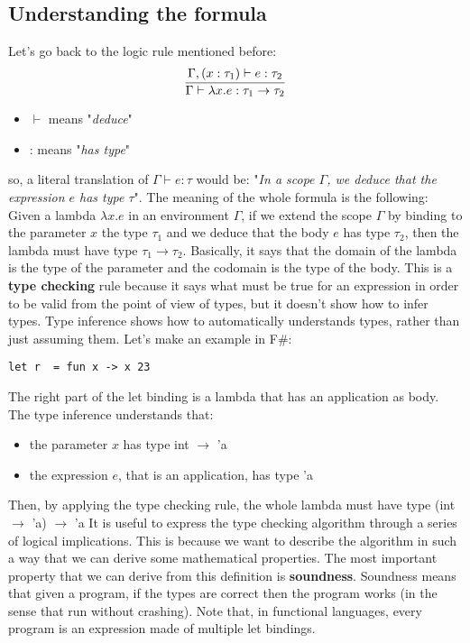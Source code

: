 \subsection{Understanding the formula}
Let's go back to the logic rule mentioned before:
\[
    \infer{\Gamma \vdash \lambda x.e : \tau_{1} \rightarrow \tau_{2}}{\Gamma, (x:\tau_{1}) \vdash e:\tau_{2}}\]
\begin{itemize}
    \item $\vdash$ means "\textit{deduce}"
    \item : means "\textit{has type}"
\end{itemize}
so, a literal translation of $\Gamma \vdash e : \tau$ would be: "\textit{In a scope $\Gamma$, we deduce that the expression $e$ has type $\tau$}".\newline\newline
The meaning of the whole formula is the following: Given a lambda $\lambda x.e$ in an environment $\Gamma$, if we extend the scope $\Gamma$ by binding to the parameter $x$ the type $\tau_{1}$ and we deduce that the body $e$ has type $\tau_{2}$, then the lambda must have type $\tau_{1} \rightarrow \tau_{2}$.  Basically, it says that the domain of the lambda is the type of the parameter and the codomain is the type of the body.\newline\newline
This is a \textbf{type checking} rule because it says what must be true for an expression in order to be valid from the point of view of types, but it doesn't show how to infer types. Type inference shows how to automatically understands types, rather than just assuming them.\newline\newline
Let's make an example in F\#:
\begin{lstlisting}[style=FSharpStyle]
    let r  = fun x -> x 23
\end{lstlisting}
The right part of the let binding is a lambda that has an application as body. The type inference understands that:
\begin{itemize}
    \item the parameter $x$ has type int $\rightarrow$ 'a
    \item the expression $e$, that is an application, has type 'a
\end{itemize}
Then, by applying the type checking rule, the whole lambda must have type (int $\rightarrow$ 'a) $\rightarrow$ 'a\newline\newline
It is useful to express the type checking algorithm through a series of logical implications. This is because we want to describe the algorithm in such a way that we can derive some mathematical properties. The most important property that we can derive from this definition is \textbf{soundness}.\newline\newline
Soundness means that given a program, if the types are correct then the program works (in the sense that run without crashing). Note that, in functional languages, every program is an expression made of multiple let bindings.
